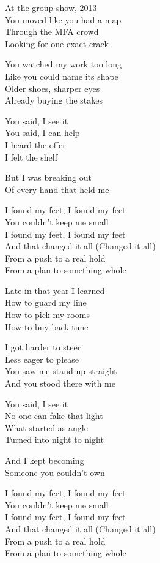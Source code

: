 \begin{lyrics}
At the group show, 2013\\
You moved like you had a map\\
Through the MFA crowd\\
Looking for one exact crack

You watched my work too long\\
Like you could name its shape\\
Older shoes, sharper eyes\\
Already buying the stakes

You said, I see it\\
You said, I can help\\
I heard the offer\\
I felt the shelf

But I was breaking out\\
Of every hand that held me

I found my feet, I found my feet\\
You couldn’t keep me small\\
I found my feet, I found my feet\\
And that changed it all
(Changed it all)\\
From a push to a real hold\\
From a plan to something whole

Late in that year I learned\\
How to guard my line\\
How to pick my rooms\\
How to buy back time

I got harder to steer\\
Less eager to please\\
You saw me stand up straight\\
And you stood there with me

You said, I see it\\
No one can fake that light\\
What started as angle\\
Turned into night to night

And I kept becoming\\
Someone you couldn’t own

I found my feet, I found my feet\\
You couldn’t keep me small\\
I found my feet, I found my feet\\
And that changed it all
(Changed it all)\\
From a push to a real hold\\
From a plan to something whole


\end{lyrics}
